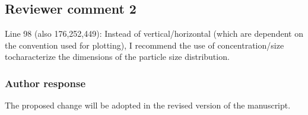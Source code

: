 \documentclass[11pt]{scrartcl}
\providecommand{\DIFadd}[1]{{\protect\textcolor{blue}{\uwave{#1}}}} %
\providecommand{\DIFdel}[1]{{\protect\textcolor{red}{\sout{#1}}}}                      %
\providecommand{\DIFaddbegin}{} %
\providecommand{\DIFaddend}{} %
\providecommand{\DIFdelbegin}{} %
\providecommand{\DIFdelend}{} %
\newenvironment{change}[1][]{%
  \begin{mdframed}[frametitle={Line #1:}]%
}{%
  \end{mdframed}%
}
\begin{document}
\subsection*{Reviewer comment 2}

Line 98 (also 176,252,449): Instead of vertical/horizontal (which are
dependent on the convention used for plotting), I recommend the use of
concentration/size tocharacterize the dimensions of the particle size
distribution.

\subsubsection*{Author response}

The proposed change will be adopted in the revised version of the manuscript.

%
%
%
%
\end{document}
